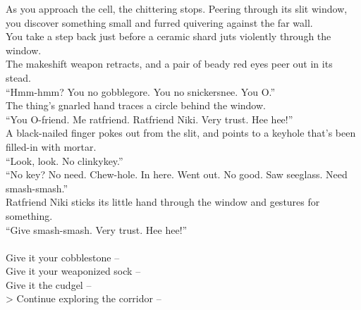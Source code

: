 As you approach the cell, the chittering stops. Peering through its slit window, you discover something small and furred quivering against the far wall.\\

You take a step back just before a ceramic shard juts violently through the window.\\

The makeshift weapon retracts, and a pair of beady red eyes peer out in its stead.\\
“Hmm-hmm? You no gobblegore. You no snickersnee. You O.”\\

The thing’s gnarled hand traces a circle behind the window.\\
“You O-friend. Me ratfriend. Ratfriend Niki. Very trust. Hee hee!”\\

A black-nailed finger pokes out from the slit, and points to a keyhole that’s been filled-in with mortar.\\
“Look, look. No clinkykey.”\\

“No key? No need. Chew-hole. In here. Went out. No good. Saw seeglass. Need smash-smash.”\\

Ratfriend Niki sticks its little hand through the window and gestures for something.\\
“Give smash-smash. Very trust. Hee hee!”\\

 \\
 Give it your cobblestone -- \\
 Give it your weaponized sock -- \\
 Give it the cudgel -- \\
> Continue exploring the corridor -- 